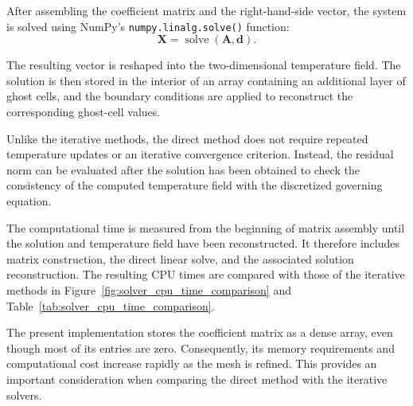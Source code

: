 After assembling the coefficient matrix and the right-hand-side vector, the system is solved using NumPy's \texttt{numpy.linalg.solve()} function:
\begin{equation}
\mathbf{X}=\operatorname{solve}(\mathbf{A},\mathbf{d}).
\label{eq:implicit_direct_solution}
\end{equation}

The resulting vector is reshaped into the two-dimensional temperature field. The solution is then stored in the interior of an array containing an additional layer of ghost cells, and the boundary conditions are applied to reconstruct the corresponding ghost-cell values.

Unlike the iterative methods, the direct method does not require repeated temperature updates or an iterative convergence criterion. Instead, the residual norm can be evaluated after the solution has been obtained to check the consistency of the computed temperature field with the discretized governing equation.

The computational time is measured from the beginning of matrix assembly until the solution and temperature field have been reconstructed. It therefore includes matrix construction, the direct linear solve, and the associated solution reconstruction. The resulting CPU times are compared with those of the iterative methods in Figure~\ref{fig:solver_cpu_time_comparison} and Table~\ref{tab:solver_cpu_time_comparison}.

The present implementation stores the coefficient matrix as a dense array, even though most of its entries are zero. Consequently, its memory requirements and computational cost increase rapidly as the mesh is refined. This provides an important consideration when comparing the direct method with the iterative solvers.

